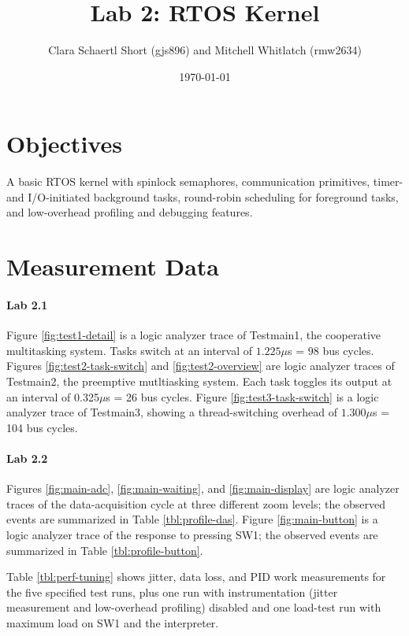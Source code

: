 \documentclass{IEEEtran}
\begin{document}
\title{Lab 2: RTOS Kernel}
\author{Clara Schaertl Short (gjs896) and Mitchell Whitlatch (rmw2634)}
\date{\today}
\maketitle

\section{Objectives}

A basic RTOS kernel with spinlock semaphores, communication primitives, timer- and I/O-initiated background tasks, round-robin scheduling for foreground tasks, and low-overhead profiling and debugging features.

\section{Measurement Data}

\paragraph{Lab 2.1}Figure \ref{fig:test1-detail} is a logic analyzer trace of Testmain1, the cooperative multitasking system. Tasks switch at an interval of $1.225\mu$s = 98 bus cycles. Figures \ref{fig:test2-task-switch} and \ref{fig:test2-overview} are logic analyzer traces of Testmain2, the preemptive mutltiasking system. Each task toggles its output at an interval of 0.325$\mu$s = 26 bus cycles. Figure \ref{fig:test3-task-switch} is a logic analyzer trace of Testmain3, showing a thread-switching overhead of $1.300\mu$s = 104 bus cycles.

\paragraph{Lab 2.2} Figures \ref{fig:main-adc}, \ref{fig:main-waiting}, and \ref{fig:main-display} are logic analyzer traces of the data-acquisition cycle at three different zoom levels; the observed events are summarized in Table \ref{tbl:profile-das}. Figure \ref{fig:main-button} is a logic analyzer trace of the response to pressing SW1; the observed events are summarized in Table \ref{tbl:profile-button}.

Table \ref{tbl:perf-tuning} shows jitter, data loss, and PID work measurements for the five specified test runs, plus one run with instrumentation (jitter measurement and low-overhead profiling) disabled and one load-test run with maximum load on SW1 and the interpreter.
\end{document}
